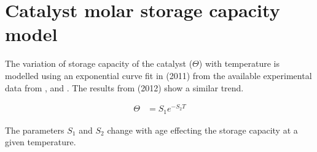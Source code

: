 \section{Catalyst molar storage capacity model}
The variation of storage capacity of the catalyst ($\Theta$) with temperature is
modelled using an exponential curve fit in \cite{hsieh2011development} (2011)
from the available experimental data from
\cite{willems2007closed}, \cite{ciardelli2004scr} and \cite{joo2008study}.  The
results from \cite{schmieg2012thermal} (2012) show a similar trend.

\begin{align*}
    \Theta &= S_1 e^{-S_2 T}
\end{align*}

The parameters $S_1$ and $S_2$ change with age effecting the storage capacity at
a given temperature.

